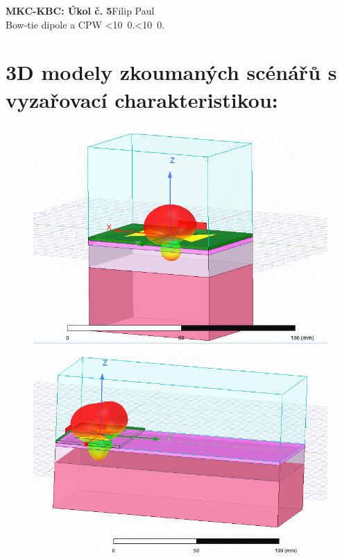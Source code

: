 \documentclass[10pt, a4paper]{article}%
\def\mydate{\leavevmode\hbox{\twodigits\day.\twodigits\month.\the\year}}
\def\twodigits#1{\ifnum#1<10 0\fi\the#1}
\begin{document}
\begin{flushleft}%
	\textbf{\Large{MKC-KBC: Úkol č. 5}}\hfill Filip Paul\\
	\large{Bow-tie dipole a CPW \hfill\mydate}
\end{flushleft}

\section{\Large 3D modely zkoumaných scénářů s vyzařovací charakteristikou:}
\begin{figure}[ht!]
	\centering
	\begin{minipage}{0.32\textwidth}
		\centering
		\includegraphics[width= 1\textwidth, height = 0.25\textheight]{3D_model.png}
	\end{minipage}%
	\hfill
	\begin{minipage}{0.32\textwidth}
		\centering
		\includegraphics[width= 1\textwidth,height = 0.25\textheight]{3D_model_long.png}

\end{minipage}
\end{figure}
\end{document}
